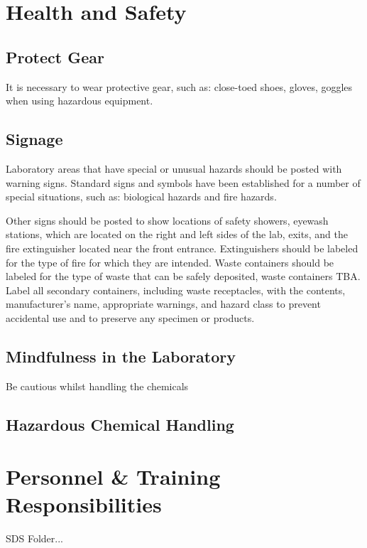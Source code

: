 \documentclass[12pt]{../SOP2}
\begin{document}
\section{Health and Safety}

\subsection{Protect Gear}

\NP It is necessary to wear protective gear, such as: close-toed shoes, gloves, goggles when using hazardous equipment.

\subsection{Signage}

\NP Laboratory areas that have special or unusual hazards should be posted with warning signs. Standard signs and symbols have been established for a number of special situations, such as: biological hazards and fire hazards.

\NP Other signs should be posted to show locations of safety showers, eyewash stations, which are located on the right and left sides of the lab, exits, and the fire extinguisher located near the front entrance. Extinguishers should be labeled for the type of fire for which they are intended. Waste containers should be labeled for the type of waste that can be safely deposited, waste containers TBA. Label all secondary containers, including waste receptacles, with the contents, manufacturer’s name, appropriate warnings, and hazard class to prevent accidental use and to preserve any specimen or products. 

\subsection{Mindfulness in the Laboratory}

Be cautious whilst handling the chemicals

\subsection{Hazardous Chemical Handling}

\section{Personnel \& Training Responsibilities}

\NP SDS Folder...
\end{document}
